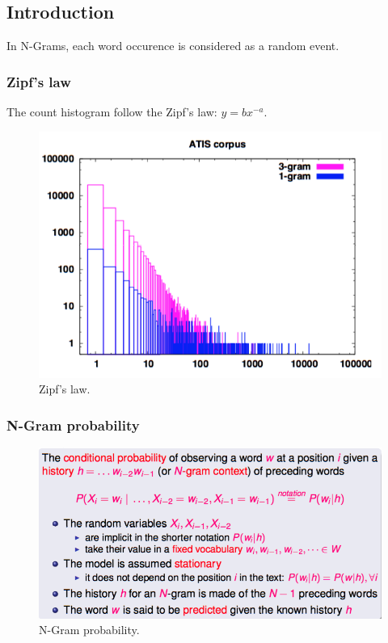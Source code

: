 \subsection{Introduction}
In N-Grams, each word occurence is considered as a random event.
\subsubsection{Zipf's law}

The count histogram follow the Zipf's law: $y = bx^{-a}$.

\begin{figure}[htp]
	\centering
	\includegraphics[scale=0.4]{images/08_zipf.png}
 	\caption{Zipf's law.}
\end{figure}

\subsubsection{N-Gram probability}

\begin{figure}[htp]
	\centering
	\includegraphics[scale=0.4]{images/09_proba.png}
 	\caption{N-Gram probability.}
\end{figure}

